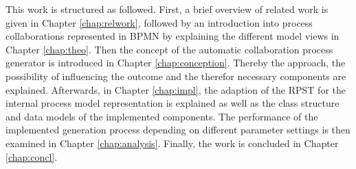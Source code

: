 This work is structured as followed. First, a brief overview of related work is given in Chapter \ref{chap:relwork}, followed by an introduction into process collaborations represented in BPMN by explaining the different model views in Chapter \ref{chap:theo}. Then the concept of the automatic collaboration process generator is introduced in Chapter \ref{chap:conception}. Thereby the approach, the possibility of influencing the outcome and the therefor necessary components are explained. Afterwards, in Chapter \ref{chap:impl}, the adaption of the RPST for the internal process model representation is explained as well as the class structure and data models of the implemented components. The performance of the implemented generation process depending on different parameter settings is then examined in Chapter \ref{chap:analysis}. Finally, the work is concluded in Chapter \ref{chap:concl}.